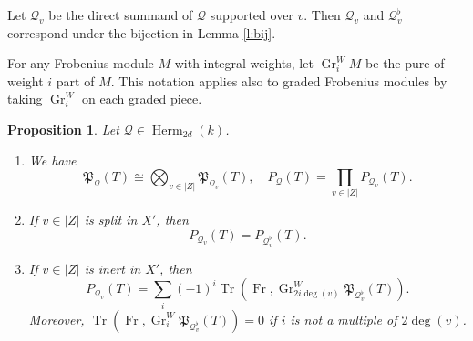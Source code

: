 \documentclass[reqno]{amsart}
\numberwithin{equation}{section}
\DeclareMathOperator{\Frob}{Fr}
\DeclareMathOperator{\Tr}{Tr}
\DeclareMathOperator{\Gr}{Gr}
\DeclareMathOperator{\Herm}{Herm}
\newcommand\bigot{\bigotimes}
\newcommand\cQ{\mathcal{Q}}
\newcommand\frP{\mathfrak{P}}
\newtheorem{prop}[thm]{Proposition}
\theoremstyle{remark}
\numberwithin{equation}{section}
\begin{document}
Let $\cQ_{v}$ be the direct summand of $\cQ$ supported over $v$.  Then $\cQ_{v}$ and $\cQ^{\flat}_{v}$ correspond under the bijection in Lemma \ref{l:bij}. 

For any Frobenius module $M$ with integral weights,  let $\Gr^{W}_{i}M$ be the pure of weight $i$ part of $M$. This notation applies also to graded Frobenius modules by taking $\Gr^{W}_{i}$ on each graded piece.

\begin{prop}\label{l:HSpr factor} Let $\cQ\in \Herm_{2d}(k)$.
\begin{enumerate}
\item We have
\begin{equation}\label{HSpr factor}
\frP_{\cQ}(T)\cong\bigot_{v\in |Z|}\frP_{\cQ_{v}}(T), \quad
P_{\cQ}(T)=\prod_{v\in |Z|}P_{\cQ_{v}}(T).
\end{equation}
\item If $v\in |Z|$ is split in $X'$, then
\begin{equation}\label{PQ split}
P_{\cQ_{v}}(T)=P_{\cQ^{\flat}_{v}}(T).
\end{equation}
\item If $v\in |Z|$ is inert in $X'$, then
\begin{equation}\label{PQ inert}
P_{\cQ_{v}}(T)=\sum_{i}(-1)^{i}\Tr(\Frob,\Gr^{W}_{2i\deg(v)}\frP_{\cQ^{\flat}_{v}}(T)).
\end{equation}
Moreover, $\Tr(\Frob,\Gr^{W}_{i}\frP_{\cQ^{\flat}_{v}}(T))=0$ if $i$ is not a multiple of $2\deg(v)$.
\end{enumerate}
\end{prop}
\end{document}
